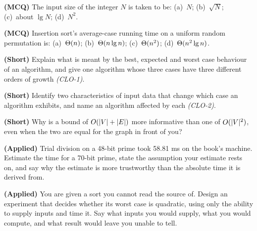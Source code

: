 \begin{reviewq}
  \item \textbf{(MCQ)} The input size of the integer $N$ is taken to be:
        (a)~$N$; (b)~$\sqrt{N}$; (c)~about $\lg N$; (d)~$N^{2}$.
  \item \textbf{(MCQ)} Insertion sort's average-case running time on a uniform
        random permutation is: (a)~$\Theta(n)$; (b)~$\Theta(n \operatorname{lg} n)$;
        (c)~$\Theta(n^{2})$; (d)~$\Theta(n^{2}\operatorname{lg} n)$.
  \item \textbf{(Short)} Explain what is meant by the best, expected and worst
        case behaviour of an algorithm, and give one algorithm whose three
        cases have three different orders of growth \emph{(CLO-1)}.
  \item \textbf{(Short)} Identify two characteristics of input data that change
        which case an algorithm exhibits, and name an algorithm affected by
        each \emph{(CLO-2)}.
  \item \textbf{(Short)} Why is a bound of $O(|V|+|E|)$ more informative
        than one of $O(|V|^{2})$, even when the two are equal for the graph
        in front of you?
  \item \textbf{(Applied)} Trial division on a 48-bit prime took 58.81 ms on
        the book's machine. Estimate the time for a 70-bit prime, state the
        assumption your estimate rests on, and say why the estimate is more
        trustworthy than the absolute time it is derived from.
  \item \textbf{(Applied)} You are given a sort you cannot read the source of.
        Design an experiment that decides whether its worst case is quadratic,
        using only the ability to supply inputs and time it. Say what inputs
        you would supply, what you would compute, and what result would leave
        you unable to tell.
\end{reviewq}
